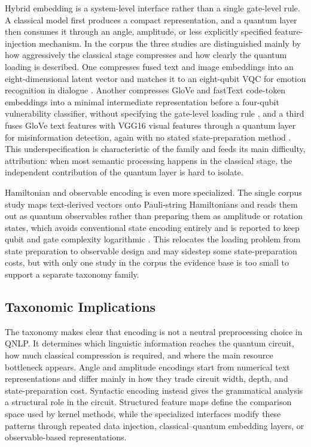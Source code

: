 \documentclass{ieeeaccess}
\begin{document}
Hybrid embedding is a system-level interface rather than a single gate-level rule. A classical model first produces a compact representation, and a quantum layer then consumes it through an angle, amplitude, or less explicitly specified feature-injection mechanism. In the corpus the three studies are distinguished mainly by how aggressively the classical stage compresses and how clearly the quantum loading is described. One compresses fused text and image embeddings into an eight-dimensional latent vector and matches it to an eight-qubit VQC for emotion recognition in dialogue \cite{castrignano_toward_2025}. Another compresses GloVe and fastText code-token embeddings into a minimal intermediate representation before a four-qubit vulnerability classifier, without specifying the gate-level loading rule \cite{akter_automated_2023}, and a third fuses GloVe text features with VGG16 visual features through a quantum layer for misinformation detection, again with no stated state-preparation method \cite{bikku_quantum-enhanced_2025}. This underspecification is characteristic of the family and feeds its main difficulty, attribution: when most semantic processing happens in the classical stage, the independent contribution of the quantum layer is hard to isolate.

Hamiltonian and observable encoding is even more specialized. The single corpus study maps text-derived vectors onto Pauli-string Hamiltonians and reads them out as quantum observables rather than preparing them as amplitude or rotation states, which avoids conventional state encoding entirely and is reported to keep qubit and gate complexity logarithmic \cite{tiblias_efficient_2026}. This relocates the loading problem from state preparation to observable design and may sidestep some state-preparation costs, but with only one study in the corpus the evidence base is too small to support a separate taxonomy family.

\subsection{Taxonomic Implications}
\label{subsec:taxonomy_implications}

The taxonomy makes clear that encoding is not a neutral preprocessing choice in QNLP. It determines which linguistic information reaches the quantum circuit, how much classical compression is required, and where the main resource bottleneck appears. Angle and amplitude encodings start from numerical text representations and differ mainly in how they trade circuit width, depth, and state-preparation cost. Syntactic encoding instead gives the grammatical analysis a structural role in the circuit. Structured feature maps define the comparison space used by kernel methods, while the specialized interfaces modify these patterns through repeated data injection, classical--quantum embedding layers, or observable-based representations.
\end{document}
